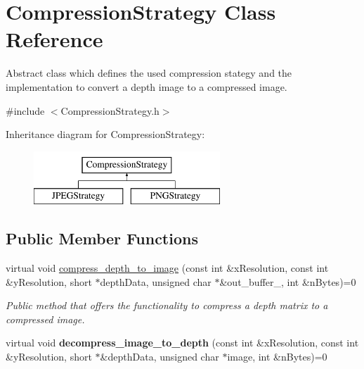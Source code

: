 \hypertarget{class_compression_strategy}{\section{Compression\+Strategy Class Reference}
\label{class_compression_strategy}
}


Abstract class which defines the used compression stategy and the implementation to convert a depth image to a compressed image.  




{\ttfamily \#include $<$Compression\+Strategy.\+h$>$}

Inheritance diagram for Compression\+Strategy\+:\begin{figure}[H]
\begin{center}
\leavevmode
\includegraphics[height=2.000000cm]{class_compression_strategy}
\end{center}
\end{figure}
\subsection*{Public Member Functions}
\begin{DoxyCompactItemize}
\item 
virtual void \hyperlink{class_compression_strategy_a5124d2838fc7d8c769a34744f21602f4}{compress\+\_\+depth\+\_\+to\+\_\+image} (const int \&x\+Resolution, const int \&y\+Resolution, short $\ast$depth\+Data, unsigned char $\ast$\&out\+\_\+buffer\+\_\+, int \&n\+Bytes)=0
\begin{DoxyCompactList}\small\item\em Public method that offers the functionality to compress a depth matrix to a compressed image. \end{DoxyCompactList}\item 
\hypertarget{class_compression_strategy_af5a3cc25e0cad0b12544c6270f18dfb5}{virtual void {\bfseries decompress\+\_\+image\+\_\+to\+\_\+depth} (const int \&x\+Resolution, const int \&y\+Resolution, short $\ast$\&depth\+Data, unsigned char $\ast$image, int \&n\+Bytes)=0}\label{class_compression_strategy_af5a3cc25e0cad0b12544c6270f18dfb5}

\end{DoxyCompactItemize}


